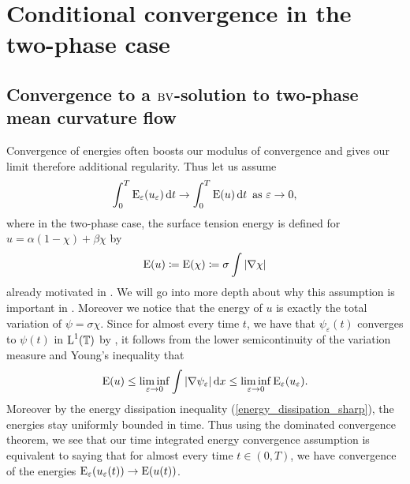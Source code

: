 \section{Conditional convergence in the two-phase case}

\subsection{Convergence to a $\operatorname{BV}$-solution to two-phase mean curvature flow}

Convergence of energies often boosts our 
modulus of convergence and gives our limit therefore additional regularity. 
Thus let us assume 
\begin{equation}
	\label{energy_convergence}
	\int_{ 0 }^{ T }
	\operatorname{E}_{ \varepsilon } ( u_{ \varepsilon } ) 
	\dd{ t }
	\to 
	\int_{ 0 }^{ T }
	\operatorname{E} ( u )
	\dd{ t }
	\text{ as }
	\varepsilon \to 0,
\end{equation}
where in the two-phase case, the surface tension energy is defined for $ u = 
\alpha ( 1 - \chi ) + 
\beta \chi $ by 
\begin{equation}
	\operatorname{E} ( u ) 
	\coloneqq
	\operatorname{E} ( \chi )
	\coloneqq
	\sigma \int \abs{ \nabla \chi }
\end{equation}
already motivated in . We will go into more depth about why 
this assumption is important in 
.
Moreover we notice that the energy of $ u $ is exactly the total variation of $ 
\psi = \sigma \chi $.
Since for almost every time $ t $, we have that $ \psi_{ \varepsilon } ( t ) $ 
converges to $ \psi ( t ) $ in $ \operatorname{L}^{ 1 }  ( \operatorname{\mathbb{T}} ) $ by 
, it follows from the lower semicontinuity of 
the variation measure and Young's inequality that
\begin{equation*}
	\operatorname{E} ( u ) 
	\leq
	\liminf_{ \varepsilon \to 0 }
	\int
	\abs{ \nabla \psi_{ \varepsilon } }
	\dd{ x }
	\leq
	\liminf_{ \varepsilon \to 0 }
	\operatorname{E}_{ \varepsilon } ( u_{ \varepsilon } ).
\end{equation*}
Moreover by the energy dissipation inequality (\ref{energy_dissipation_sharp}), 
the energies stay uniformly bounded in time. Thus using the dominated 
convergence theorem, we see that our time integrated energy convergence 
assumption is equivalent to saying that for almost every time $ t \in ( 0, T ) 
$, we have convergence of the energies $ \operatorname{E}_{ \varepsilon } ( u_{ 
\varepsilon } ( t ) ) \to \operatorname{E} ( u ( t ) ) $.

